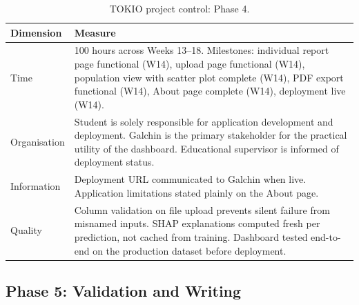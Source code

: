 \documentclass[11pt,a4paper]{article}
\begin{document}
\begin{table}[H]
  \centering
  \caption{TOKIO project control: Phase 4.}
  \label{tab:tokio4}
  \small
  \begin{tabular}{p{2.2cm} p{11cm}}
    \toprule
    \textbf{Dimension} & \textbf{Measure} \\
    \midrule
    Time         & 100 hours across Weeks 13--18. Milestones: individual report page functional (W14), upload page functional (W14), population view with scatter plot complete (W14), PDF export functional (W14), About page complete (W14), deployment live (W14). \\
    Organisation & Student is solely responsible for application development and deployment. Galchin is the primary stakeholder for the practical utility of the dashboard. Educational supervisor is informed of deployment status. \\
    Information  & Deployment URL communicated to Galchin when live. Application limitations stated plainly on the About page. \\
    Quality      & Column validation on file upload prevents silent failure from misnamed inputs. SHAP explanations computed fresh per prediction, not cached from training. Dashboard tested end-to-end on the production dataset before deployment. \\
    \bottomrule
  \end{tabular}
\end{table}

\subsection{Phase 5: Validation and Writing}
\end{document}
